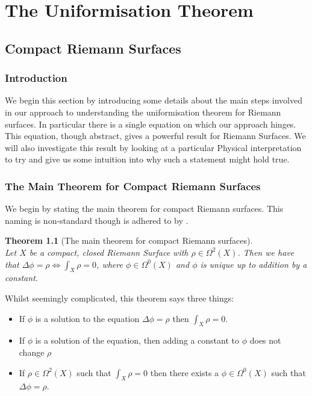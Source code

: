 \documentclass[a4paper,12pt]{report}
\theoremstyle{plain}
\newtheorem{thm}{Theorem}[section]
\theoremstyle{definition}
\begin{document}
\chapter{The Uniformisation Theorem}
\section{Compact Riemann Surfaces}
\subsection{Introduction}
We begin this section by introducing some details about the main steps involved 
in our approach to understanding the uniformisation theorem for Riemann surfaces. 
In particular there is a single equation on which our approach hinges. This 
equation, though abstract, gives a powerful result for Riemann Surfaces. We will 
also investigate this result by looking at a particular Physical interpretation 
to try and give us some intuition into why such a statement might hold true.
\subsection{The Main Theorem for Compact Riemann Surfaces}
We begin by stating the main theorem for compact Riemann surfaces. This naming is 
non-standard though is adhered to by \cite{donaldson}.
\begin{thm} [The main theorem for compact Riemann surfaces]\label{MTCRS} ~\\
Let $X$ be a compact, closed Riemann Surface with $\rho \in \Omega^2(X)$. 
Then we have that $\Delta \phi = \rho \Leftrightarrow \int_X \rho = 0$,
where $ \phi \in \Omega^0(X)$ and $\phi$ is unique up to addition by a constant.
\end{thm}
Whilst seemingly complicated, this theorem says three things:
\begin{itemize}
\item[1.] If $\phi$ is a solution to the equation $\Delta \phi = \rho$ then $
\int_X \rho = 0$.
\item[2.] If $\phi$ is a solution of the equation, then adding a constant to $
\phi$ does not change $\rho$
\item[3.] If $\rho \in \Omega^2(X)$ such that $\int_X \rho = 0$ then there exists 
a $\phi \in \Omega^0(X)$ such that $\Delta \phi = \rho$.
\end{itemize}
\end{document}
